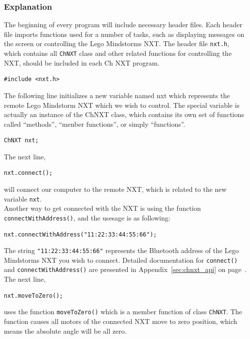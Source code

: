 \documentclass[11pt]{article}
\begin{document}
\subsubsection*{Explanation}
The beginning of every program will include necessary header files. Each header file 
imports functions used for a number of tasks, such as displaying messages on the 
screen or controlling the Lego Mindstorms NXT. The header file {\tt nxt.h}, which 
contains all {\tt ChNXT} class and other related functions for controlling the 
NXT, should be included in each Ch NXT program.
\begin{lstlisting}
#include <nxt.h>
\end{lstlisting}
The following line initializes a new variable named nxt which represents the remote 
Lego Mindstorm NXT which we wish to control. The special variable is actually an 
instance of the ChNXT class, which contains its own set of functions called ``methods'', 
``menber functions'', or simply ``functions''.
\begin{lstlisting}
ChNXT nxt;
\end{lstlisting}
The next line,
\begin{lstlisting}
nxt.connect();
\end{lstlisting}
will connect our computer to the remote NXT, which is related to the new variable 
{\tt nxt}.\\

Another way to get connected with the NXT is using the function {\tt connectWithAddress()}, 
and the usesage is as following:
\begin{lstlisting}
nxt.connectWithAddress("11:22:33:44:55:66");
\end{lstlisting}
The string {\tt "11:22:33:44:55:66"} represents the Bluetooth address of the Lego 
Mindstorms NXT you wish to connect. Detailed documentation for {\tt connect()} 
and {\tt connectWithAddress()} are presented in Appendix~\ref{sec:chnxt_api} on 
page~\pageref{sec:chnxt_api}. The next line,
\begin{lstlisting}
nxt.moveToZero();
\end{lstlisting}
uses the function {\tt moveToZero()} which is a member function of class {\tt ChNXT}. 
The function causes all motors of the connected NXT move to zero position, which 
means the absolute angle will be all zero.\\
\end{document}
